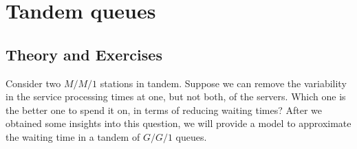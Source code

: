 
\section{Tandem queues}
\label{sec:tandem-queues}


\subsection*{Theory and Exercises}



Consider two $M/M/1$ stations in tandem. Suppose we can remove the variability in the service processing times at one, but not both, of the servers. Which one is the better one to spend it on, in terms of reducing waiting times?  After we obtained some insights into this question, we will provide a model to approximate the waiting time in a tandem  of $G/G/1$ queues.

